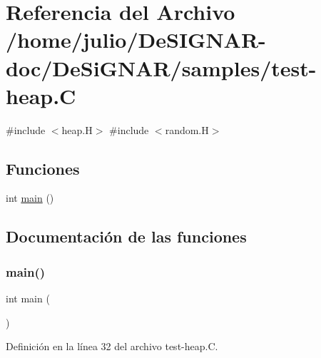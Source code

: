 \hypertarget{test-heap_8_c}{}\section{Referencia del Archivo /home/julio/\+De\+S\+I\+G\+N\+A\+R-\/doc/\+De\+Si\+G\+N\+A\+R/samples/test-\/heap.C}
\label{test-heap_8_c}
{\ttfamily \#include $<$heap.\+H$>$}\newline
{\ttfamily \#include $<$random.\+H$>$}\newline
\subsection*{Funciones}
\begin{DoxyCompactItemize}
\item 
int \hyperlink{test-heap_8_c_ae66f6b31b5ad750f1fe042a706a4e3d4}{main} ()
\end{DoxyCompactItemize}


\subsection{Documentación de las funciones}
\mbox{\label{test-heap_8_c_ae66f6b31b5ad750f1fe042a706a4e3d4}} 
\subsubsection{\texorpdfstring{main()}{main()}}
{\footnotesize\ttfamily int main (\begin{DoxyParamCaption}{ }\end{DoxyParamCaption})}



Definición en la línea 32 del archivo test-\/heap.\+C.

